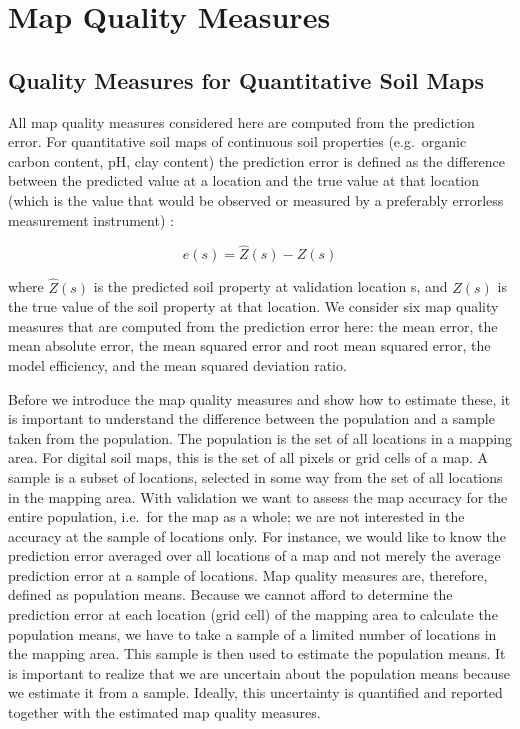 \documentclass[10pt,b5paper,]{book}
\theoremstyle{definition}
\theoremstyle{definition}
\theoremstyle{definition}
\theoremstyle{remark}
\begin{document}
\hypertarget{QualMeasures}{%
\section{Map Quality Measures}\label{QualMeasures}}

\hypertarget{quality-measures-for-quantitative-soil-maps}{%
\subsection{Quality Measures for Quantitative Soil
Maps}\label{quality-measures-for-quantitative-soil-maps}}

All map quality measures considered here are computed from the
prediction error. For quantitative soil maps of continuous soil
properties (e.g.~organic carbon content, pH, clay content) the
prediction error is defined as the difference between the predicted
value at a location and the true value at that location (which is the
value that would be observed or measured by a preferably errorless
measurement instrument) \citep{brus2011sampling}:

\begin{equation}
e(s) = \hat{Z}(s) - Z(s)
\end{equation}

where \({\hat{Z}(s)}\) is the predicted soil property at validation
location s, and \({Z(s)}\) is the true value of the soil property at
that location. We consider six map quality measures that are computed
from the prediction error here: the mean error, the mean absolute error,
the mean squared error and root mean squared error, the model
efficiency, and the mean squared deviation ratio.

Before we introduce the map quality measures and show how to estimate
these, it is important to understand the difference between the
population and a sample taken from the population. The population is the
set of all locations in a mapping area. For digital soil maps, this is
the set of all pixels or grid cells of a map. A sample is a subset of
locations, selected in some way from the set of all locations in the
mapping area. With validation we want to assess the map accuracy for the
entire population, i.e.~for the map as a whole; we are not interested in
the accuracy at the sample of locations only. For instance, we would
like to know the prediction error averaged over all locations of a map
and not merely the average prediction error at a sample of locations.
Map quality measures are, therefore, defined as population means.
Because we cannot afford to determine the prediction error at each
location (grid cell) of the mapping area to calculate the population
means, we have to take a sample of a limited number of locations in the
mapping area. This sample is then used to estimate the population means.
It is important to realize that we are uncertain about the population
means because we estimate it from a sample. Ideally, this uncertainty is
quantified and reported together with the estimated map quality
measures.
\end{document}
